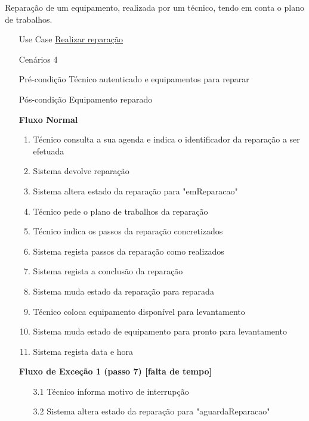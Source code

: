 \documentclass[../relatorio.tex]{subfiles}
\begin{document}
Reparação de um equipamento, realizada por um técnico, tendo em conta o plano de trabalhos.
\begin{itemize}
    \item[Use Case] {\underline{Realizar reparação}}
    \item[Cenários] {4}
    \item[Pré-condição] {Técnico autenticado e equipamentos para reparar}
    \item[Pós-condição] {Equipamento reparado}
          \begin{flushleft}
              \textbf{Fluxo Normal}
          \end{flushleft}
          \begin{enumerate}
              \item Técnico consulta a sua agenda e indica o identificador da reparação a ser efetuada
              \item Sistema devolve reparação
              \item Sistema altera estado da reparação para "emReparacao"
              \item Técnico pede o plano de trabalhos da reparação
              \item Técnico indica os passos da reparação concretizados
              \item Sistema regista passos da reparação como realizados
              \item Sistema regista a conclusão da reparação
              \item Sistema muda estado da reparação para reparada
              \item Técnico coloca equipamento disponível para levantamento
              \item Sistema muda estado de equipamento para pronto para levantamento
              \item Sistema regista data e hora
          \end{enumerate}
          \begin{flushleft}
              \textbf{Fluxo de Exceção 1 (passo 7) [falta de tempo]}
          \end{flushleft}
          \begin{itemize}
              \item[3.1]{Técnico informa motivo de interrupção}
              \item[3.2]{Sistema altera estado da reparação para "aguardaReparacao"}
          \end{itemize}
          \begin{flushleft}

\end{flushleft}
\end{itemize}
\end{document}
